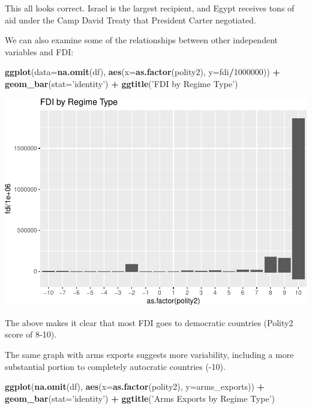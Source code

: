\documentclass[12pt,]{article}
\newenvironment{Shaded}{\begin{snugshade}}{\end{snugshade}}
\newcommand{\DataTypeTok}[1]{\textcolor[rgb]{0.13,0.29,0.53}{#1}}
\newcommand{\DecValTok}[1]{\textcolor[rgb]{0.00,0.00,0.81}{#1}}
\newcommand{\KeywordTok}[1]{\textcolor[rgb]{0.13,0.29,0.53}{\textbf{#1}}}
\newcommand{\NormalTok}[1]{#1}
\newcommand{\OperatorTok}[1]{\textcolor[rgb]{0.81,0.36,0.00}{\textbf{#1}}}
\newcommand{\StringTok}[1]{\textcolor[rgb]{0.31,0.60,0.02}{#1}}
\begin{document}
This all looks correct. Israel is the largest recipient, and Egypt
receives tons of aid under the Camp David Treaty that President Carter
negotiated.

We can also examine some of the relationships between other independent
variables and FDI:

\begin{Shaded}
\begin{Highlighting}[]
\KeywordTok{ggplot}\NormalTok{(}\DataTypeTok{data=}\KeywordTok{na.omit}\NormalTok{(df), }\KeywordTok{aes}\NormalTok{(}\DataTypeTok{x=}\KeywordTok{as.factor}\NormalTok{(polity2), }\DataTypeTok{y=}\NormalTok{fdi}\OperatorTok{/}\DecValTok{1000000}\NormalTok{)) }\OperatorTok{+}
\StringTok{    }\KeywordTok{geom_bar}\NormalTok{(}\DataTypeTok{stat=}\StringTok{'identity'}\NormalTok{) }\OperatorTok{+}
\StringTok{    }\KeywordTok{ggtitle}\NormalTok{(}\StringTok{'FDI by Regime Type'}\NormalTok{)}
\end{Highlighting}
\end{Shaded}

\includegraphics{proposal_files/figure-latex/unnamed-chunk-19-1.pdf}

The above makes it clear that most FDI goes to democratic countries
(Polity2 score of 8-10).

The same graph with arms exports suggests more variability, including a
more substantial portion to completely autocratic countries (-10).

\begin{Shaded}
\begin{Highlighting}[]
\KeywordTok{ggplot}\NormalTok{(}\KeywordTok{na.omit}\NormalTok{(df), }\KeywordTok{aes}\NormalTok{(}\DataTypeTok{x=}\KeywordTok{as.factor}\NormalTok{(polity2), }\DataTypeTok{y=}\NormalTok{arms_exports)) }\OperatorTok{+}\StringTok{ }
\StringTok{    }\KeywordTok{geom_bar}\NormalTok{(}\DataTypeTok{stat=}\StringTok{'identity'}\NormalTok{) }\OperatorTok{+}
\StringTok{    }\KeywordTok{ggtitle}\NormalTok{(}\StringTok{'Arms Exports by Regime Type'}\NormalTok{)}
\end{Highlighting}
\end{Shaded}
\end{document}
